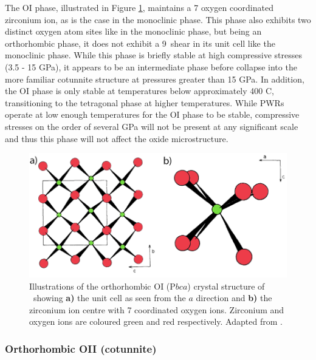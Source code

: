 The OI phase, illustrated in Figure \ref{fig:orthorhombic_I}, maintains a 7 oxygen coordinated zirconium ion, as is the case in the monoclinic phase. This phase also exhibits two distinct oxygen atom sites like in the monoclinic phase, but being an orthorhombic phase, it does not exhibit a 9\textdegree\ shear in its unit cell like the monoclinic phase. While this phase is briefly stable at high compressive stresses (3.5 - 15 GPa), it appears to be an intermediate phase before collapse into the more familiar cotunnite structure at pressures greater than 15 GPa. In addition, the OI phase is only stable at temperatures below approximately 400 \textdegree C, transitioning to the tetragonal phase at higher temperatures. While PWRs operate at low enough temperatures for the OI phase to be stable, compressive stresses on the order of several GPa will not be present at any significant scale and thus this phase will not affect the oxide microstructure. 


\begin{figure}[ht]
  \centering
      \includegraphics[width=\linewidth]{images/orthorhombic_I.png}
  \caption[Illustrations of the orthorhombic OI (P$bca$) crystal structure of \zirconia\ showing \textbf{a)} the unit cell viewed along the $a$ direction and \textbf{b)} the zirconium ion centre with 7 coordinated oxygen ions. Zirconium and oxygen ions are coloured green and red respectively.]{Illustrations of the orthorhombic OI (P$bca$) crystal structure of \zirconia\ showing \textbf{a)} the unit cell as seen from the $a$ direction and \textbf{b)} the zirconium ion centre with 7 coordinated oxygen ions. Zirconium and oxygen ions are coloured green and red respectively. Adapted from \cite{kisi1989crystal}.}
  \label{fig:orthorhombic_I}
\end{figure}


\subsubsection{Orthorhombic OII (cotunnite)}

